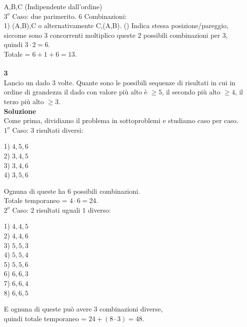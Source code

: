 \documentclass[11pt]{article}
\begin{document}
            A,B,C (Indipendente dall'ordine)\\
            $3^o$ Caso: due parimerito. $6$ Combinazioni:\\
            1) (A,B),C o alternativamente C,(A,B). () Indica stessa posizione/pareggio, siccome sono $3$ concorrenti moltiplico queste $2$ possibili combinazioni per $3$, quindi $3 \cdot 2 = 6$.\\
            Totale = $6 + 1 + 6 = 13$.\\
            \\
            \textbf{\large 3}\\
            Lancio un dado $3$ volte. Quante sono le possibili sequenze di risultati in cui in ordine di grandezza il dado con valore più alto è $\geq 5$, il secondo più alto $\geq 4$, il terzo più alto $\geq 3$.\\
            \textbf{\large Soluzione}\\
            Come prima, dividiamo il problema in sottoproblemi e studiamo caso per caso.\\
            $1^o$ Caso: $3$ risultati diversi:
            \begin{center}
            	1) $4, 5, 6$\\
            	2) $3, 4, 5$\\
            	3) $3, 4, 6$\\
            	4) $3, 5, 6$\\
            \end{center}
            Ognuna di queste ha 6 possibili combinazioni.\\
            Totale temporaneo = $4 \cdot 6 = 24$.\\
            $2^o$ Caso: $2$ risultati uguali $1$ diverso:
            \begin{center}
            	1) $4,4,5$\\
            	2) $4,4,6$\\
            	3) $5,5,3$\\
            	4) $5,5,4$\\
            	5) $5,5,6$\\
            	6) $6,6,3$\\
            	7) $6,6,4$\\
            	8) $6,6,5$\\
            \end{center}
            E ognuna di queste pu\`o avere $3$ combinazioni diverse, \\quindi totale temporaneo = $24 + (8 \cdot 3) = 48$.\\
\end{document}
